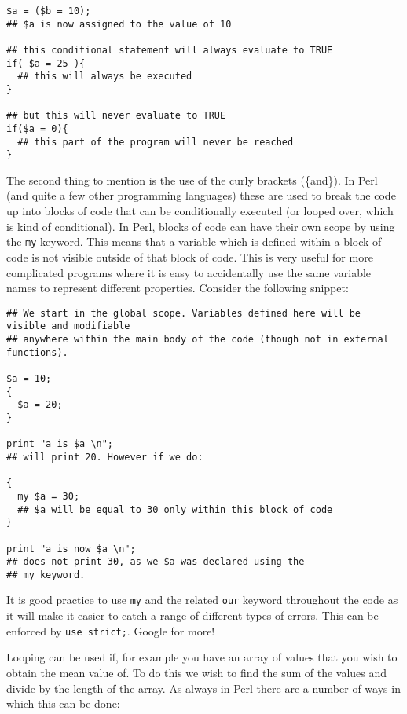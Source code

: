 \documentclass[11pt]{article}
\begin{document}
\begin{verbatim}
$a = ($b = 10);
## $a is now assigned to the value of 10

## this conditional statement will always evaluate to TRUE
if( $a = 25 ){
  ## this will always be executed
}

## but this will never evaluate to TRUE
if($a = 0){
  ## this part of the program will never be reached
}
\end{verbatim}

The second thing to mention is the use of the curly brackets (\{and\}). In
Perl (and quite a few other programming languages) these are used to
break the code up into blocks of code that can be conditionally executed
(or looped over, which is kind of conditional). In Perl, blocks of code
can have their own scope by using the \texttt{my} keyword. This means that a
variable which is defined within a block of code is not visible outside
of that block of code. This is very useful for more complicated programs
where it is easy to accidentally use the same variable names to represent
different properties.
Consider the following snippet:

\begin{verbatim}
## We start in the global scope. Variables defined here will be visible and modifiable
## anywhere within the main body of the code (though not in external functions).

$a = 10;
{
  $a = 20;
}

print "a is $a \n";
## will print 20. However if we do:

{
  my $a = 30;
  ## $a will be equal to 30 only within this block of code
}

print "a is now $a \n";
## does not print 30, as we $a was declared using the
## my keyword.
\end{verbatim}

It is good practice to use \texttt{my} and the related \texttt{our} keyword throughout
the code as it will make it easier to catch a range of different types
of errors. This can be enforced by \texttt{use strict;}. Google for more!

Looping can be used if, for example you have an array of values that you wish to
obtain the mean value of. To do this we wish to find the sum of the
values and divide by the length of the array. As always in Perl there
are a number of ways in which this can be done:
\end{document}
